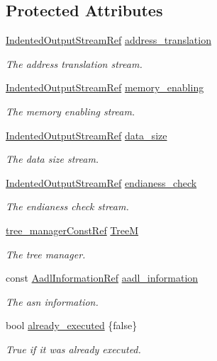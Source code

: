 \subsection*{Protected Attributes}
\begin{DoxyCompactItemize}
\item 
\hyperlink{indented__output__stream_8hpp_ab32278e11151ef292759c88e99b77feb}{Indented\+Output\+Stream\+Ref} \hyperlink{classCreateAddressTranslation_a891db1631bb7940e6653d2b1b6ecf079}{address\+\_\+translation}
\begin{DoxyCompactList}\small\item\em The address translation stream. \end{DoxyCompactList}\item 
\hyperlink{indented__output__stream_8hpp_ab32278e11151ef292759c88e99b77feb}{Indented\+Output\+Stream\+Ref} \hyperlink{classCreateAddressTranslation_a43fc1a6d78daf7adff355bee133ce150}{memory\+\_\+enabling}
\begin{DoxyCompactList}\small\item\em The memory enabling stream. \end{DoxyCompactList}\item 
\hyperlink{indented__output__stream_8hpp_ab32278e11151ef292759c88e99b77feb}{Indented\+Output\+Stream\+Ref} \hyperlink{classCreateAddressTranslation_aa0fb7eb48552fe76477b714dfae993f8}{data\+\_\+size}
\begin{DoxyCompactList}\small\item\em The data size stream. \end{DoxyCompactList}\item 
\hyperlink{indented__output__stream_8hpp_ab32278e11151ef292759c88e99b77feb}{Indented\+Output\+Stream\+Ref} \hyperlink{classCreateAddressTranslation_a3db34cf61e2a35eb04651f67185f54a6}{endianess\+\_\+check}
\begin{DoxyCompactList}\small\item\em The endianess check stream. \end{DoxyCompactList}\item 
\hyperlink{tree__manager_8hpp_a792e3f1f892d7d997a8d8a4a12e39346}{tree\+\_\+manager\+Const\+Ref} \hyperlink{classCreateAddressTranslation_a576636dd93b1399610782fbcb3d4b03c}{TreeM}
\begin{DoxyCompactList}\small\item\em The tree manager. \end{DoxyCompactList}\item 
const \hyperlink{aadl__information_8hpp_ad2aa3a9df7fbf64760e8fc1a5e7b9b3e}{Aadl\+Information\+Ref} \hyperlink{classCreateAddressTranslation_a0f2fb7ac9be0df4f2d1109d97d1564de}{aadl\+\_\+information}
\begin{DoxyCompactList}\small\item\em The asn information. \end{DoxyCompactList}\item 
bool \hyperlink{classCreateAddressTranslation_a0d4b362eb276f1ac3362404c1501e573}{already\+\_\+executed} \{false\}
\begin{DoxyCompactList}\small\item\em True if it was already executed. \end{DoxyCompactList}\end{DoxyCompactItemize}
